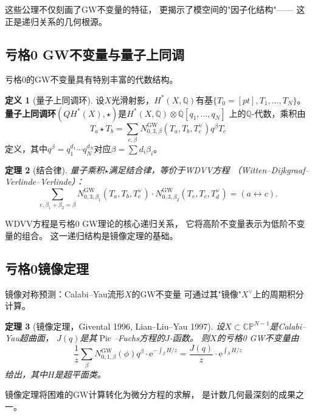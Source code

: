 \documentclass[11pt,a4paper]{article}
\theoremstyle{plain}
\newtheorem{theorem}{定理}[section]
\theoremstyle{definition}
\newtheorem{definition}[theorem]{定义}
\newcommand{\Q}{\mathbb{Q}}
\newcommand{\CP}{\mathbb{CP}}
\newcommand{\ee}{\mathrm{e}}
\newcommand{\Pic}{\operatorname{Pic}}
\newcommand{\GWinv}{N^{\mathrm{GW}}}
\begin{document}
这些公理不仅刻画了GW不变量的特征，
更揭示了模空间的"因子化结构"——
这正是递归关系的几何根源。

\subsection{亏格0 GW不变量与量子上同调}

亏格0的GW不变量具有特别丰富的代数结构。

\begin{definition}[量子上同调环]\label{def:qcoh}
设$X$光滑射影，$H^*(X, \Q)$有基$\{T_0=[pt], T_1, \ldots, T_N\}$。
\textbf{量子上同调环}$(QH^*(X), \star)$是$H^*(X, \Q) \otimes \Q[q_1, \ldots, q_N]$
上的$\Q$-代数，乘积由
\[
T_a \star T_b = \sum_{c, \beta} \GWinv_{0,3,\beta}(T_a, T_b, T_c^\vee) q^\beta T_c
\]
定义，其中$q^\beta = q_1^{d_1} \cdots q_N^{d_N}$对应$\beta = \sum d_i \beta_i$。
\end{definition}

\begin{theorem}[结合律]\label{thm:assoc}
量子乘积$\star$满足结合律，等价于WDVV方程
（Witten--Dijkgraaf--Verlinde--Verlinde）：
\[
\sum_{e, \beta_1+\beta_2=\beta}
\GWinv_{0,3,\beta_1}(T_a, T_b, T_e^\vee) \cdot
\GWinv_{0,3,\beta_2}(T_e, T_c, T_d^\vee)
= (a \leftrightarrow c).
\]
\end{theorem}

WDVV方程是亏格0 GW理论的核心递归关系，
它将高阶不变量表示为低阶不变量的组合。
这一递归结构是镜像定理的基础。

\subsection{亏格0镜像定理}

镜像对称预测：Calabi--Yau流形$X$的GW不变量
可通过其"镜像"$X^\vee$上的周期积分计算。

\begin{theorem}[镜像定理，Givental 1996, Lian--Liu--Yau 1997]\label{thm:mirror}
设$X \subset \CP^{N-1}$是Calabi--Yau超曲面，
$J(q)$是其$\Pic$--Fuchs方程的$J$-函数。
则$X$的亏格0 GW不变量由
\[
\frac{1}{z} \sum_{\beta} \GWinv_{0,1,\beta}(\phi) q^\beta \cdot \ee^{-\int_\beta H/z}
= \frac{J(q)}{z} \cdot \ee^{\int_\beta H/z}
\]
给出，其中$H$是超平面类。
\end{theorem}

镜像定理将困难的GW计算转化为微分方程的求解，
是计数几何最深刻的成果之一。



\end{document}
